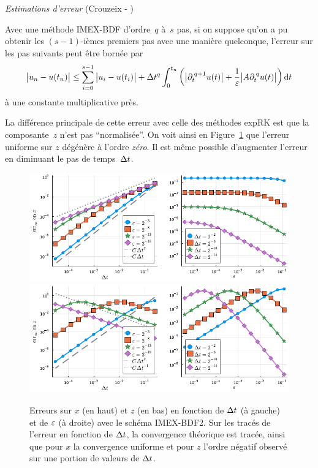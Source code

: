 \bigskip\noindent%
\textit{Estimations d'erreur} (Crouzeix - \cite{crouzeix.1980.methode})

Avec une méthode IMEX-BDF d'ordre~$q$ à~$s$ pas, si on suppose qu'on a pu obtenir les $(s-1)$-ièmes premiers pas avec une manière quelconque, l'erreur sur les pas suivants peut être bornée par 
\begin{equation*}
    \big| u_n - u(t_n) \big| \leq
    \sum_{i = 0}^{s-1} \big| u_i - u(t_i) \big|
    + \Delta t^q \int_0^{t_n} \left( 
        \big| \partial_t^{\: q+1} u(t) \big| 
        + \frac{1}{\varepsilon} \big| A \partial_t^{\: q} u(t) \big| 
    \right) \mathrm{d} t 
\end{equation*}
à une constante multiplicative près.

\medskip
La différence principale de cette erreur avec celle des méthodes expRK est que la composante~$z$ n'est pas \enquote{normalisée}. On voit ainsi en Figure~\ref{sec:intro:fig:bdf2} que l'erreur uniforme sur $z$ dégénère à l'ordre \textit{zéro}. Il est même possible d'augmenter l'erreur en diminuant le pas de temps~$\Delta t$. 

\begin{figure}[!h]
    \centering
    \includegraphics[width=\textwidth]{./Presentation/bdf2_err_x.pdf}
    \includegraphics[width=\textwidth]{./Presentation/bdf2_err_z.pdf}
    \caption{Erreurs sur $x$ (en haut) et $z$ (en bas) en fonction de $\Delta t$ (à gauche) et de $\varepsilon$ (à droite) avec le schéma IMEX-BDF2. Sur les tracés de l'erreur en fonction de $\Delta t$, la convergence théorique est tracée, ainsi que pour $x$ la convergence uniforme et pour $z$ l'ordre négatif observé sur une portion de valeurs de $\Delta t$.}
    \label{sec:intro:fig:bdf2}
\end{figure}

